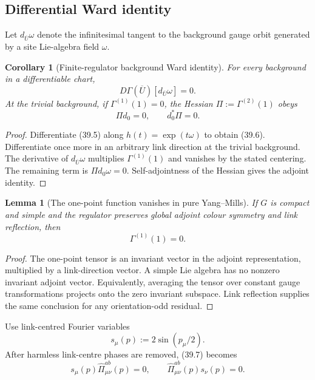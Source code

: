 \documentclass[11pt,oneside]{book}
\newtheorem{lemma}[theorem]{Lemma}
\newtheorem{corollary}[theorem]{Corollary}
\theoremstyle{definition}
\theoremstyle{remark}
\begin{document}
\subsection{Differential Ward identity}

Let \(d_{\overline U}\omega\) denote the infinitesimal tangent to the
background gauge orbit generated by a site Lie-algebra field
\(\omega\).

\begin{corollary}[Finite-regulator background Ward identity]
\label{cor:e8v39-Ward}
For every background in a differentiable chart,
\[
                         D\Gamma(\overline U)
 [d_{\overline U}\omega]=0.                                     \tag{39.6}
\]
At the trivial background, if \(\Gamma^{(1)}(1)=0\), the Hessian
\(\Pi:=\Gamma^{(2)}(1)\) obeys
\[
                         \Pi d_0=0,\qquad d_0^*\Pi=0.             \tag{39.7}
\]
\end{corollary}

\begin{proof}
Differentiate (39.5) along \(h(t)=\exp(t\omega)\) to obtain
(39.6).  Differentiate once more in an arbitrary link direction at
the trivial background.  The derivative of
\(d_{\overline U}\omega\) multiplies \(\Gamma^{(1)}(1)\) and
vanishes by the stated centering.  The remaining term is
\(\Pi d_0\omega=0\).  Self-adjointness of the Hessian gives the
adjoint identity.
\end{proof}

\begin{lemma}[The one-point function vanishes in pure Yang--Mills]
\label{lem:e8v39-one-point}
If \(G\) is compact and simple and the regulator preserves global
adjoint colour symmetry and link reflection, then
\[
                              \Gamma^{(1)}(1)=0.                  \tag{39.8}
\]
\end{lemma}

\begin{proof}
The one-point tensor is an invariant vector in the adjoint
representation, multiplied by a link-direction vector.  A simple
Lie algebra has no nonzero invariant adjoint vector.  Equivalently,
averaging the tensor over constant gauge transformations projects
onto the zero invariant subspace.  Link reflection supplies the same
conclusion for any orientation-odd residual.
\end{proof}

Use link-centred Fourier variables
\[
                         s_\mu(p):=2\sin(p_\mu/2).                \tag{39.9}
\]
After harmless link-centre phases are removed, (39.7) becomes
\[
 s_\mu(p)\widehat\Pi_{\mu\nu}^{ab}(p)=0,\qquad
 \widehat\Pi_{\mu\nu}^{ab}(p)s_\nu(p)=0.                         \tag{39.10}
\]
\end{document}
